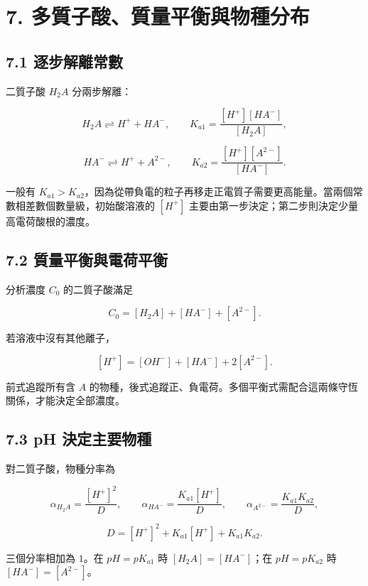 \documentclass[11pt,a4paper]{article}
\begin{document}
\section{7. 多質子酸、質量平衡與物種分布}\label{ux591aux8ceaux5b50ux9178ux8ceaux91cfux5e73ux8861ux8207ux7269ux7a2eux5206ux5e03}

\subsection{7.1 逐步解離常數}\label{ux9010ux6b65ux89e3ux96e2ux5e38ux6578}

二質子酸 \(H_2A\) 分兩步解離：

\[
H_2A\rightleftharpoons H^++HA^-,
\qquad
K_{a1}=\frac{[H^+][HA^-]}{[H_2A]},
\]

\[
HA^-\rightleftharpoons H^++A^{2-},
\qquad
K_{a2}=\frac{[H^+][A^{2-}]}{[HA^-]}.
\]

一般有 \(K_{a1}>K_{a2}\)，因為從帶負電的粒子再移走正電質子需要更高能量。當兩個常數相差數個數量級，初始酸溶液的 \([H^+]\) 主要由第一步決定；第二步則決定少量高電荷酸根的濃度。

\subsection{7.2 質量平衡與電荷平衡}\label{ux8ceaux91cfux5e73ux8861ux8207ux96fbux8377ux5e73ux8861}

分析濃度 \(C_0\) 的二質子酸滿足

\[
C_0=[H_2A]+[HA^-]+[A^{2-}].
\]

若溶液中沒有其他離子，

\[
[H^+]=[OH^-]+[HA^-]+2[A^{2-}].
\]

前式追蹤所有含 \(A\) 的物種，後式追蹤正、負電荷。多個平衡式需配合這兩條守恆關係，才能決定全部濃度。

\subsection{7.3 pH 決定主要物種}\label{ph-ux6c7aux5b9aux4e3bux8981ux7269ux7a2e}

對二質子酸，物種分率為

\[
\alpha_{H_2A}=\frac{[H^+]^2}{D},\qquad
\alpha_{HA^-}=\frac{K_{a1}[H^+]}{D},\qquad
\alpha_{A^{2-}}=\frac{K_{a1}K_{a2}}{D},
\]

\[
D=[H^+]^2+K_{a1}[H^+]+K_{a1}K_{a2}.
\]

三個分率相加為 \(1\)。在 \(pH=pK_{a1}\) 時 \([H_2A]=[HA^-]\)；在 \(pH=pK_{a2}\) 時 \([HA^-]=[A^{2-}]\)。
\end{document}
